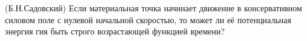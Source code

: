 (Б.Н.Садовский)
Если материальная точка начинает движение в консервативном силовом
поле с нулевой начальной скоростью, то может ли её потенциальная энергия
гия быть строго возрастающей функцией времени?
